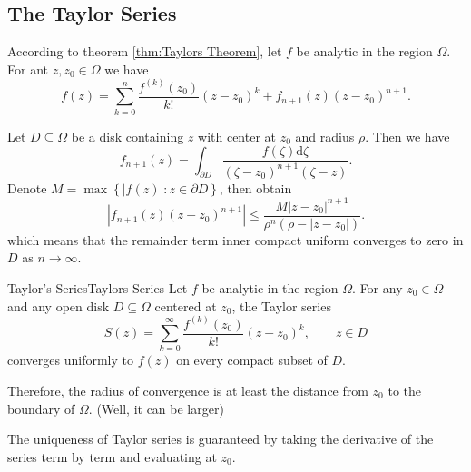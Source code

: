 \documentclass[../main.tex]{subfiles}
\begin{document}
\subsection{The Taylor Series}

According to theorem \ref{thm:Taylors Theorem}, let $f$ be analytic in the region $\Omega$. For ant $z,z_0\in \Omega$ we have
\begin{equation*}
	f(z) = \sum_{k=0}^n \frac{f^{(k)}(z_0)}{k!} (z-z_0)^k + f_{n+1}(z)(z-z_0)^{n+1}.
\end{equation*}

Let $D \subseteq \Omega$ be a disk containing $z$ with center at $z_0$ and radius $\rho$. Then we have
\begin{equation*}
	f_{n+1}(z) = \int_{\partial D} \frac{f(\zeta)\mathrm{d} \zeta}{(\zeta-z_0)^{n+1}(\zeta-z)}.
\end{equation*}
Denote  $M = \max \left\{ \left|f(z)\right|: z\in \partial D \right\}$, then obtain
\begin{equation}
	\left|f_{n+1}(z)(z-z_0)^{n+1}\right| \leq \frac{M \left|z-z_0\right|^{n+1}}{\rho^n(\rho-\left|z-z_0\right|)}.
\end{equation}
which means that the remainder term inner compact uniform converges to zero in $D$ as $n\to \infty$.

\begin{theorem}{Taylor's Series}{Taylors Series}
	Let $f$ be analytic in the region $\Omega$. For any $z_0\in \Omega$ and any open disk $D \subseteq \Omega$ centered at $z_0$, the Taylor series
	\begin{equation*}
		S(z) = \sum_{k=0}^{\infty} \frac{f^{(k)}(z_0)}{k!} (z-z_0)^k, \qquad z\in D
	\end{equation*}
	converges uniformly to $f(z)$ on every compact subset of $D$.
\end{theorem}
Therefore, the radius of convergence is at least the distance from $z_0$ to the boundary of $\Omega$. (Well, it can be larger)

\begin{remark}
	The uniqueness of Taylor series is guaranteed by taking the derivative of the series term by term and evaluating at $z_0$.
\end{remark}
\end{document}
